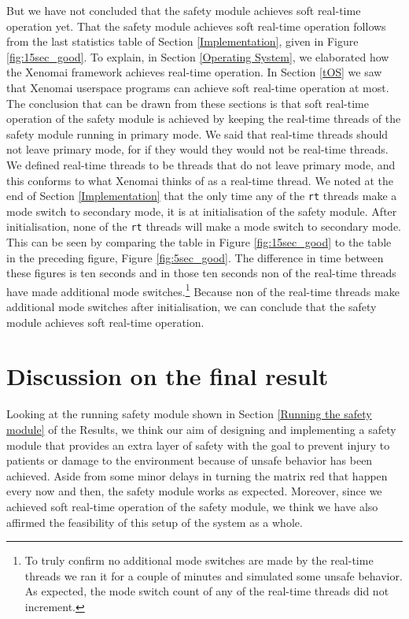 \documentclass[12pt]{scrreprt}
\begin{document}
But we have not concluded that the safety module achieves soft real-time operation yet. That the safety module achieves soft real-time operation follows from the last statistics table of Section \ref{Implementation}, given in Figure \ref{fig:15sec_good}. To explain, in Section \ref{Operating System}, we elaborated how the Xenomai framework achieves real-time operation. In Section \ref{tOS} we saw that Xenomai userspace programs can achieve soft real-time operation at most. The conclusion that can be drawn from these sections is that soft real-time operation of the safety module is achieved by keeping the real-time threads of the safety module running in primary mode. We said that real-time threads should not leave primary mode, for if they would they would not be real-time threads. We defined real-time threads to be threads that do not leave primary mode, and this conforms to what Xenomai thinks of as a real-time thread. We noted at the end of Section \ref{Implementation} that the only time any of the \texttt{rt} threads make a mode switch to secondary mode, it is at initialisation of the safety module. After initialisation, none of the \texttt{rt} threads will make a mode switch to secondary mode. This can be seen by comparing the table in Figure \ref{fig:15sec_good} to the table in the preceding figure, Figure \ref{fig:5sec_good}. The difference in time between these figures is ten seconds and in those ten seconds non of the real-time threads have made additional mode switches.\footnote{To truly confirm no additional mode switches are made by the real-time threads we ran it for a couple of minutes and simulated some unsafe behavior. As expected, the mode switch count of any of the real-time threads did not increment.} Because non of the real-time threads make additional mode switches after initialisation, we can conclude that the safety module achieves soft real-time operation.

\section{Discussion on the final result}
Looking at the running safety module shown in Section \ref{Running the safety module} of the Results, we think our aim of designing and implementing a safety module that provides an extra layer of safety with the goal to prevent injury to patients or damage to the environment because of unsafe behavior has been achieved. Aside from some minor delays in turning the matrix red that happen every now and then, the safety module works as expected. Moreover, since we achieved soft real-time operation of the safety module, we think we have also affirmed the feasibility of this setup of the system as a whole.
\end{document}
